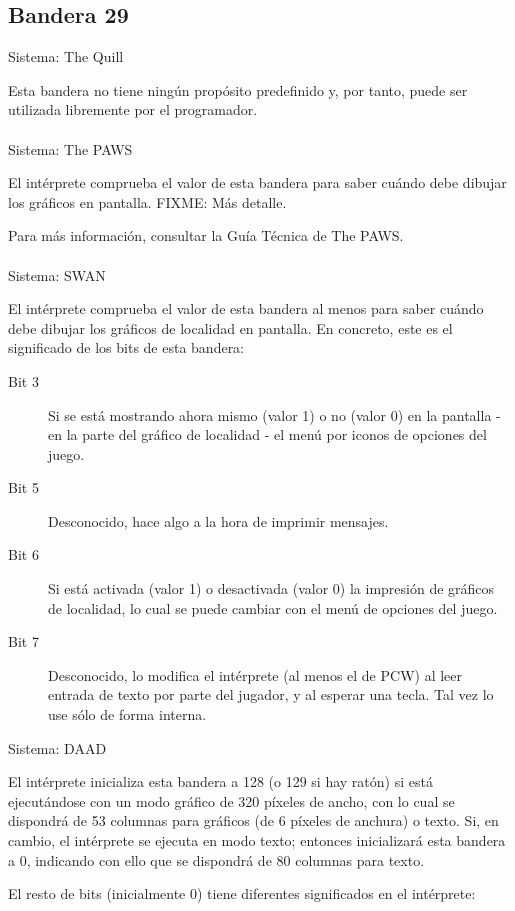 \documentclass[11pt, a5paper]{article}
\newcommand{\quill}{\textsf{The Quill}\xspace}
\newcommand{\paw}{\textsf{The PAWS}\xspace}
\newcommand{\swan}{\textsf{SWAN}\xspace}
\newcommand{\daad}{\textsf{DAAD}\xspace}
\newcommand{\sistema}[1]{\noindent Sistema: #1 \nopagebreak}
\begin{document}
\subsection{Bandera 29}\label{flag29}

\sistema{\quill}

Esta bandera no tiene ningún propósito predefinido y, por tanto, puede ser utilizada libremente por el programador.
\\\ \\
\sistema{\paw}

El intérprete comprueba el valor de esta bandera para saber cuándo debe dibujar los gráficos en pantalla. FIXME: Más detalle.

Para más información, consultar la Guía Técnica de \paw \cite{PawsZX}.
\\\ \\
\sistema{\swan}

El intérprete comprueba el valor de esta bandera al menos para saber cuándo debe dibujar los gráficos de localidad en pantalla. En concreto, este es el significado de los bits de esta bandera:

\begin{description}
  \item[Bit 3] Si se está mostrando ahora mismo (valor 1) o no (valor 0) en la pantalla - en la parte del gráfico de localidad - el menú por iconos de opciones del juego.
  \item[Bit 5] Desconocido, hace algo a la hora de imprimir mensajes.
  \item[Bit 6] Si está activada (valor 1) o desactivada (valor 0) la impresión de gráficos de localidad, lo cual se puede cambiar con el menú de opciones del juego.
  \item[Bit 7] Desconocido, lo modifica el intérprete (al menos el de PCW) al leer entrada de texto por parte del jugador, y al esperar una tecla. Tal vez lo use sólo de forma interna.
\end{description}

\sistema{\daad}

El intérprete inicializa esta bandera a 128 (o 129 si hay ratón) si está ejecutándose con un modo gráfico de 320 píxeles de ancho, con lo cual se dispondrá de 53 columnas para gráficos (de 6 píxeles de anchura) o texto. Si, en cambio, el intérprete se ejecuta en modo texto; entonces inicializará esta bandera a 0, indicando con ello que se dispondrá de 80 columnas para texto.

El resto de bits (inicialmente 0) tiene diferentes significados en el intérprete:
\end{document}
